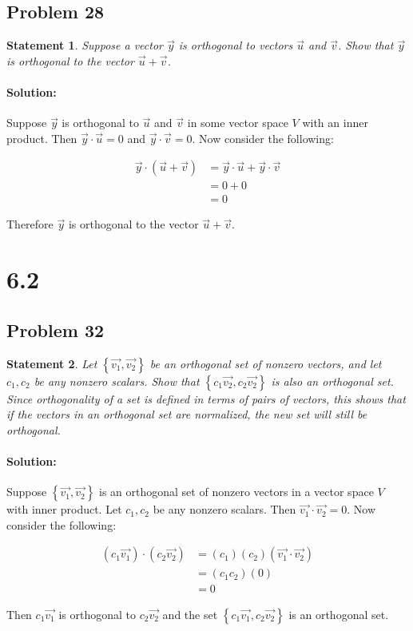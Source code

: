 \documentclass[12pt, letterpaper]{article}
\theoremstyle{statement}
\theoremstyle{statement}
\newtheorem*{atmStat}{Statement}
\newenvironment{Solution}{\noindent\ignorespaces\paragraph{Solution:}}{\hfill \ding{122}\par\noindent}
\begin{document}
    \subsection*{Problem 28}
    \begin{atmStat}
    Suppose a vector $\Vec{y}$ is orthogonal to vectors $\Vec{u}$ and $\Vec{v}$. Show that $\Vec{y}$ is orthogonal to the vector $\Vec{u} + \Vec{v}$.
    \end{atmStat}
    \begin{Solution}
    Suppose $\Vec{y}$ is orthogonal to $\Vec{u}$ and $\Vec{v}$ in some vector space $V$ with an inner product. Then $\Vec{y}\cdot\Vec{u} = 0$ and $\Vec{y}\cdot\Vec{v}=0$. Now consider the following:
    
    \begin{align*}
    \Vec{y}\cdot(\Vec{u}+\Vec{v}) &= \Vec{y}\cdot\Vec{u} + \Vec{y}\cdot\Vec{v} \\
    &= 0 + 0 \\
    &= 0
    \end{align*}
    
    Therefore $\Vec{y}$ is orthogonal to the vector $\Vec{u}+\Vec{v}$.
    
    \end{Solution}
    
    \section*{6.2}
    \subsection*{Problem 32}
    \begin{atmStat}
    Let $\left\{ \Vec{v_1}, \Vec{v_2}\right\}$ be an orthogonal set of nonzero vectors, and let $c_1, c_2$ be any nonzero scalars. Show that $\left\{ c_1\Vec{v_2}, c_2\Vec{v_2}\right\}$ is also an orthogonal set. Since orthogonality of a set is defined in terms of pairs of vectors, this shows that if the vectors in an orthogonal set are normalized, the new set will still be orthogonal.
    \end{atmStat}
    \begin{Solution}
    Suppose $\left\{ \Vec{v_1}, \Vec{v_2} \right\}$ is an orthogonal set of nonzero vectors in a vector space $V$ with inner product. Let $c_1, c_2$ be any nonzero scalars. Then $\Vec{v_1}\cdot\Vec{v_2}=0$. Now consider the following:
    
    \begin{align*}
        (c_1\Vec{v_1})\cdot(c_2\Vec{v_2}) &= (c_1)(c_2)(\Vec{v_1}\cdot\Vec{v_2}) \\
        &= (c_1c_2)(0) \\
        &= 0 
    \end{align*}
    
    Then $c_1\Vec{v_1}$ is orthogonal to $c_2\Vec{v_2}$ and the set $\left\{ c_1\Vec{v_1},c_2\Vec{v_2}\right\}$ is an orthogonal set.
    \end{Solution}
    
\end{document}
